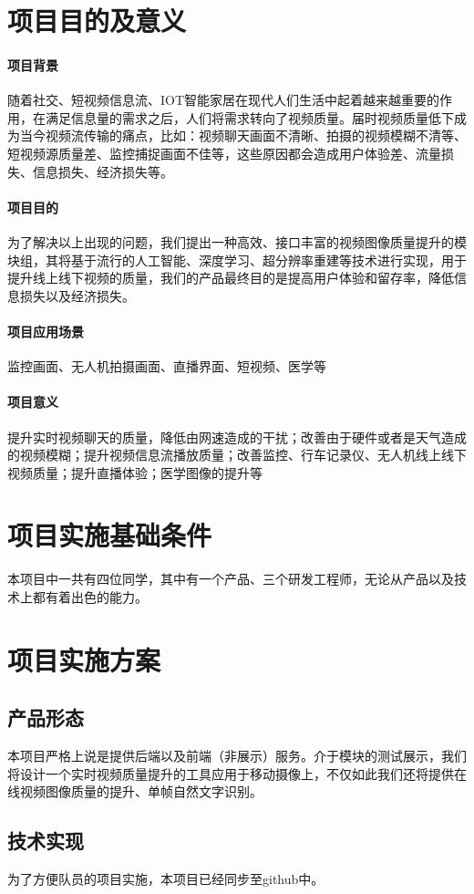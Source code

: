 \documentclass[UTF8]{ctexart}
\begin{document}
\section{项目目的及意义}
\paragraph{项目背景}
随着社交、短视频信息流、IOT智能家居在现代人们生活中起着越来越重要的作用，在满足信息量的需求之后，人们将需求转向了视频质量。届时视频质量低下成为当今视频流传输的痛点，比如：视频聊天画面不清晰、拍摄的视频模糊不清等、短视频源质量差、监控捕捉画面不佳等，这些原因都会造成用户体验差、流量损失、信息损失、经济损失等。
\paragraph{项目目的}
为了解决以上出现的问题，我们提出一种高效、接口丰富的视频图像质量提升的模块组，其将基于流行的人工智能、深度学习、超分辨率重建等技术进行实现，用于提升线上线下视频的质量，我们的产品最终目的是提高用户体验和留存率，降低信息损失以及经济损失。
\paragraph{项目应用场景}
监控画面、无人机拍摄画面、直播界面、短视频、医学等
\paragraph{项目意义}
提升实时视频聊天的质量，降低由网速造成的干扰；改善由于硬件或者是天气造成的视频模糊；提升视频信息流播放质量；改善监控、行车记录仪、无人机线上线下视频质量；提升直播体验；医学图像的提升等
\section{项目实施基础条件}
本项目中一共有四位同学，其中有一个产品、三个研发工程师，无论从产品以及技术上都有着出色的能力。
\section{项目实施方案}
\subsection{产品形态}
本项目严格上说是提供后端以及前端（非展示）服务。介于模块的测试展示，我们将设计一个实时视频质量提升的工具应用于移动摄像上，不仅如此我们还将提供在线视频图像质量的提升、单帧自然文字识别。
\subsection{技术实现}
为了方便队员的项目实施，本项目已经同步至github中。
\end{document}
